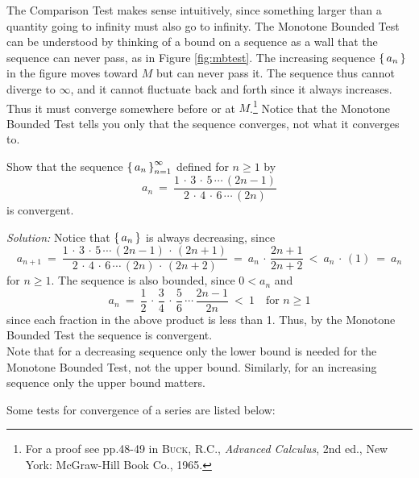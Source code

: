 \piccaption[]{\label{fig:mbtest}}
\noindent The Comparison Test makes sense intuitively, since something larger
than a quantity going to infinity must also go to infinity. The Monotone Bounded
Test can be understood by thinking of a bound on a sequence as a wall that the
sequence can never pass, as in Figure \ref{fig:mbtest}. The increasing sequence
$\left\lbrace\mspace{3mu}a_n\mspace{3mu}\right\rbrace$ in the figure moves toward $M$ but can never pass it. The sequence
thus cannot diverge to
$\infty$, and it cannot fluctuate back and forth since it always increases. Thus
it must converge somewhere before or at $M$.\footnote{For a proof see pp.48-49
in \textsc{Buck, R.C.}, \emph{Advanced Calculus}, 2nd ed., New York: McGraw-Hill
Book Co., 1965.} Notice that the Monotone Bounded Test tells you only that the
sequence converges, not what it converges to.

\begin{exmp}
\noindent Show that the sequence $\left\lbrace\mspace{3mu}a_n\mspace{3mu}\right\rbrace_{n=1}^{\infty}$ defined for $n\ge 1$
by
\[
a_n ~=~ \frac{1 \,\cdot\, 3 \,\cdot\, 5 \,\cdots\, (2n-1)}
{2 \,\cdot\, 4 \,\cdot\, 6 \,\cdots\, (2n)}
\]
is convergent.\vspace{1mm}
\par\noindent\emph{Solution:} Notice that $\left\lbrace\mspace{3mu}a_n\mspace{3mu}\right\rbrace$ is always decreasing,
since
\[
a_{n+1} ~=~ \frac{1 \,\cdot\, 3 \,\cdot\, 5 \,\cdots\, (2n-1) \,\cdot\, (2n+1)}
{2 \,\cdot\, 4 \,\cdot\, 6 \,\cdots\, (2n)\,\cdot\, (2n+2)} ~=~
a_n \,\cdot\, \frac{2n+1}{2n+2} ~<~ a_n \,\cdot\, (1) ~=~ a_n
\]
for $n\ge 1$. The sequence is also bounded, since $0 < a_n$ and
\[
a_n ~=~ \frac{1}{2} \,\cdot\, \frac{3}{4} \,\cdot\, \frac{5}{6} \,\cdots\,
\frac{2n-1}{2n} ~<~ 1 \quad\text{for $n\ge 1$}
\]
since each fraction in the above product is less than 1. Thus, by the Monotone
Bounded Test the sequence is convergent.\\Note that for a decreasing sequence
only the lower bound is needed for the Monotone Bounded Test, not the upper
bound. Similarly, for an increasing sequence only the upper bound matters.
\end{exmp}
\divider
\newpage
\noindent Some tests for convergence of a series are listed below:


